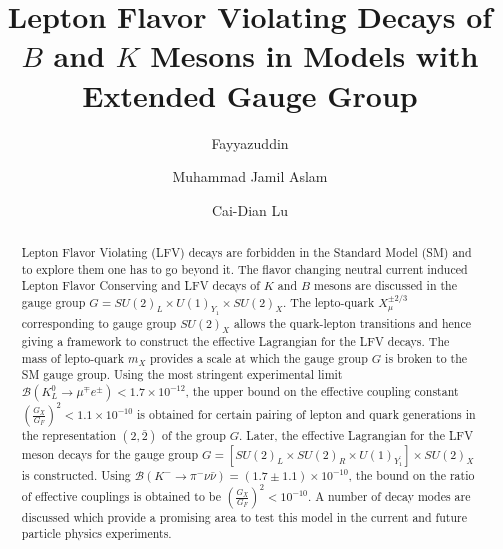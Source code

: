 \documentclass{ws-ijmpa}
\begin{document}
\title{Lepton Flavor Violating Decays of $B$ and $K$ Mesons in Models with Extended Gauge Group}

\author{Fayyazuddin}

\address{National Centre for Physics, Quaid-i-Azam University Campus, Islamabad 45320, Pakistan}

\author{Muhammad Jamil Aslam}

\address{Physics Department, Quaid-i-Azam University, Islamabad 45320, Pakistan and
Institute of High Energy Physics, Chinese Academy of Sciences, Beijing 100049, China.}

\author{Cai-Dian Lu}

\address {Institute of High Energy Physics, Chinese Academy of Sciences, Beijing 100049, China and
School of Physics, University of Chinese Academy of Sciences, Beijing 100049, China.}


\maketitle

\begin{abstract}
Lepton Flavor Violating (LFV) decays are forbidden in the Standard Model (SM) and to explore them one has to go beyond it. The flavor changing neutral current induced Lepton Flavor Conserving  and LFV decays of $K$ and $B$ mesons are discussed in the gauge group $G = SU(2)_L\times U(1)_{Y_1}\times SU(2)_X$. The lepto-quark $X^{\pm 2/3}_{\mu}$ corresponding to gauge group $ SU(2)_X$ allows the quark-lepton transitions and hence giving a framework to construct the effective Lagrangian for the LFV decays. The mass of lepto-quark $m_{X}$ provides a scale at which the gauge group $G$ is broken to the SM gauge group. Using the most stringent experimental limit $\mathcal{B}(K^{0}_{L}\to \mu^{\mp}e^{\pm}) < 1.7 \times 10^{-12}$, the upper bound on the effective coupling constant $(\frac{G_{X}}{G_F})^2 < 1.1 \times 10^{-10}$ is obtained for certain pairing of lepton and quark generations in the representation $(2, \bar{2})$ of the group $G$. Later, the effective Lagrangian for the LFV meson decays for the gauge group $G = \left[SU(2)_{L}\times SU(2)_{R}\times U(1)_{Y_1^{\prime}}\right]\times SU(2)_{X}$ is constructed. Using $\mathcal{B}(K^{-} \to \pi^{-}\nu \bar{\nu}) = (1.7 \pm 1.1)\times 10^{-10}$, the bound on the ratio of effective couplings is obtained to be $\left(\frac{G_{X}}{G_{F}}\right)^2 < 10^{-10}$. A number of decay modes are discussed which provide a promising area to test this model in the current and future particle physics experiments.

\end{abstract}
\end{document}

